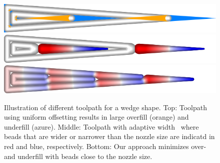 \begin{figure}\centering
\includegraphics[width=\columnwidth]{sources-intro-TEST-naive-accuracy.png}
\includegraphics[width=\columnwidth]{sources-intro-TEST-Center-widths.png}
\includegraphics[width=\columnwidth]{sources-intro-TEST-InwardDistributed-widths.png}
\caption{
Illustration of different toolpath for a wedge shape.
Top: Toolpath using uniform offsetting results in large overfill (orange) and underfill (azure).
Middle: Toolpath with adaptive width~\cite{Jin2017JMS} where beads that are wider or narrower than the nozzle size are indicatd in red and blue, respectively.
Bottom: Our approach minimizes over- and underfill with beads close to the nozzle size.
}
\label{intro_wedge}
\end{figure}




